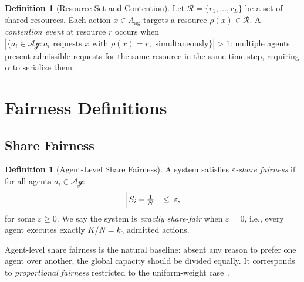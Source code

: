 \documentclass[11pt]{article}
\theoremstyle{plain}
\theoremstyle{definition}
\newtheorem{definition}[theorem]{Definition}
\theoremstyle{remark}
\newcommand{\Agents}{\mathcal{Ag}}         %
\newcommand{\Resources}{\mathcal{R}}       %
\newcommand{\Share}[1]{S_{#1}}             %
\newcommand{\kbound}{k_0}                  %
\newcommand{\Kcap}{K}                      %
\newcommand{\alloc}{\alpha}                %
\begin{document}
\begin{definition}[Resource Set and Contention]
\label{def:resources}
Let $\Resources = \{r_1, \ldots, r_L\}$ be a set of shared resources.
Each action $x \in A_{\mathrm{ag}}$ targets a resource
$\rho(x) \in \Resources$.  A \emph{contention event} at resource $r$
occurs when $|\{a_i \in \Agents : a_i \text{ requests } x \text{ with }
\rho(x) = r, \text{ simultaneously}\}| > 1$: multiple agents present
admissible requests for the same resource in the same time step,
requiring $\alloc$ to serialize them.
\end{definition}

\section{Fairness Definitions}
\label{sec:fairness-defs}

%
%
%
%

\subsection{Share Fairness}
\label{sec:share-fairness}

\begin{definition}[Agent-Level Share Fairness]
\label{def:agent-fair}
A system satisfies \emph{$\varepsilon$-share fairness} if for all
agents $a_i \in \Agents$:
\[
  \Bigl|\,\Share{i} - \tfrac{1}{N}\,\Bigr| \;\leq\; \varepsilon,
\]
for some $\varepsilon \geq 0$.  We say the system is \emph{exactly
share-fair} when $\varepsilon = 0$, i.e., every agent executes exactly
$\Kcap/N = \kbound$ admitted actions.
\end{definition}

Agent-level share fairness is the natural baseline: absent any reason to
prefer one agent over another, the global capacity should be divided
equally.  It corresponds to \emph{proportional fairness} restricted to
the uniform-weight case~\citep{kelly98}.
\end{document}
